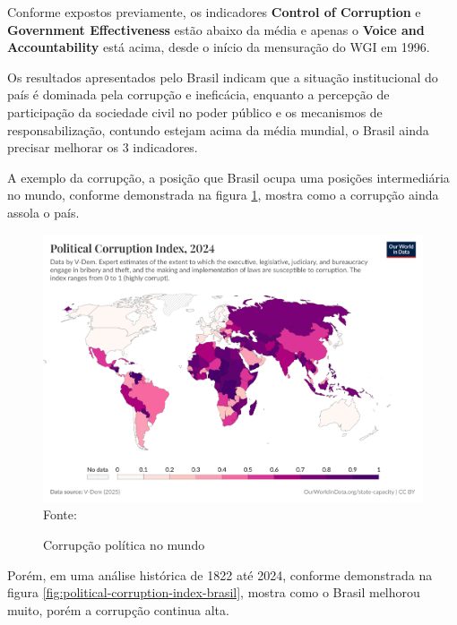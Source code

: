 Conforme expostos previamente, os indicadores \textbf{Control of Corruption} e \textbf{Government Effectiveness} estão abaixo da média e apenas o \textbf{Voice and Accountability} está acima, desde o início da mensuração do WGI em 1996.

Os resultados apresentados pelo Brasil indicam que a situação institucional do país é dominada pela corrupção e ineficácia, enquanto a percepção de participação da sociedade civil no poder público e os mecanismos de responsabilização, contundo estejam acima da média mundial, o Brasil ainda precisar melhorar os 3 indicadores. 

A exemplo da corrupção, a posição que Brasil ocupa uma posições intermediária no mundo, conforme demonstrada na figura \ref{fig:political-corruption-index}, mostra como a corrupção ainda assola o país.

\begin{figure}[H]
	\centering
	\caption{Corrupção política no mundo}
	\includegraphics[width=1\linewidth]{figuras/political-corruption-index}
	\label{fig:political-corruption-index}
	\footnotesize{Fonte: \cite{political-corruption-index}}
\end{figure} 

Porém, em uma análise histórica de 1822 até 2024, conforme demonstrada na figura \ref{fig:political-corruption-index-brasil}, mostra como o Brasil melhorou muito, porém a corrupção continua alta.

